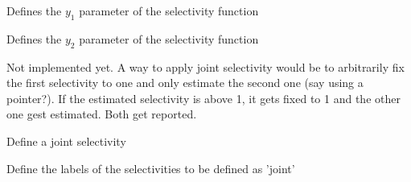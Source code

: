  {Defines the $y_1$ parameter of the selectivity function}

 {Defines the $y_2$ parameter of the selectivity function}

\TODO

Not implemented yet. A way to apply joint selectivity would be to arbitrarily fix the first selectivity to one and only estimate the second one (say using a pointer?). If the estimated selectivity is above 1, it gets fixed to 1 and the other one gest estimated. Both get reported.

 {Define a joint selectivity}

 {Define the labels of the selectivities to be defined as 'joint'}

\TODOend